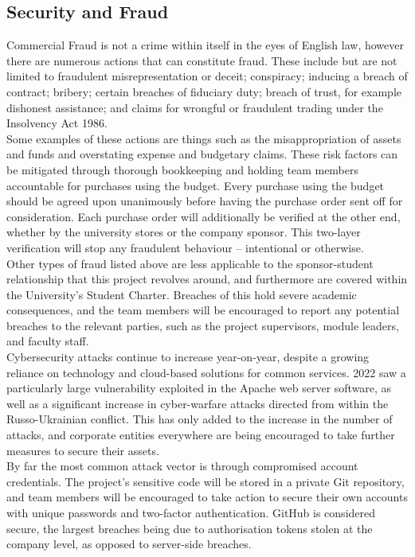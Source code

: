 \documentclass [12pt]{article}
\begin{document}
\subsection{Security and Fraud}\label{sec:Security_and_Fraud}

Commercial Fraud is not a crime within itself in the eyes of English law, however there are numerous actions that can constitute fraud. These include but are not limited to fraudulent misrepresentation or deceit; conspiracy; inducing a breach of contract; bribery; certain breaches of fiduciary duty; breach of trust, for example dishonest assistance; and claims for wrongful or fraudulent trading under the Insolvency Act 1986.
\\
Some examples of these actions are things such as the misappropriation of assets and funds and overstating expense and budgetary claims. These risk factors can be mitigated through thorough bookkeeping and holding team members accountable for purchases using the budget. Every purchase using the budget should be agreed upon unanimously before having the purchase order sent off for consideration. Each purchase order will additionally be verified at the other end, whether by the university stores or the company sponsor. This two-layer verification will stop any fraudulent behaviour – intentional or otherwise.
\\
Other types of fraud listed above are less applicable to the sponsor-student relationship that this project revolves around, and furthermore are covered within the University’s Student Charter. Breaches of this hold severe academic consequences, and the team members will be encouraged to report any potential breaches to the relevant parties, such as the project supervisors, module leaders, and faculty staff.
\\
Cybersecurity attacks continue to increase year-on-year, despite a growing reliance on technology and cloud-based solutions for common services. 2022 saw a particularly large vulnerability exploited in the Apache web server software, as well as a significant increase in cyber-warfare attacks directed from within the Russo-Ukrainian conflict. This has only added to the increase in the number of attacks, and corporate entities everywhere are being encouraged to take further measures to secure their assets.
\\
By far the most common attack vector is through compromised account credentials. The project’s sensitive code will be stored in a private Git repository, and team members will be encouraged to take action to secure their own accounts with unique passwords and two-factor authentication. GitHub is considered secure, the largest breaches being due to authorisation tokens stolen at the company level, as opposed to server-side breaches.
\end{document}
